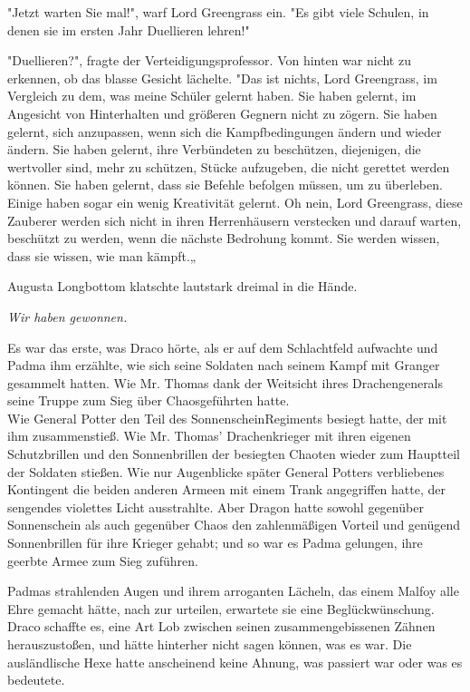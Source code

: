 {"Jetzt warten Sie mal!", warf Lord Greengrass ein. "Es gibt viele Schulen, in denen sie im ersten Jahr Duellieren lehren!"

"Duellieren?", fragte der Verteidigungsprofessor. Von hinten war nicht zu erkennen, ob das blasse Gesicht lächelte. "Das ist nichts, Lord Greengrass, im Vergleich zu dem, was meine Schüler gelernt haben. Sie haben gelernt, im Angesicht von Hinterhalten und größeren Gegnern nicht zu zögern. Sie haben gelernt, sich anzupassen, wenn sich die Kampfbedingungen ändern und wieder ändern. Sie haben gelernt, ihre Verbündeten zu beschützen, diejenigen, die wertvoller sind, mehr zu schützen, Stücke aufzugeben, die nicht gerettet werden können. Sie haben gelernt, dass sie Befehle befolgen müssen, um zu überleben. Einige haben sogar ein wenig Kreativität gelernt. Oh nein, Lord Greengrass, diese Zauberer werden sich nicht in ihren Herrenhäusern verstecken und darauf warten, beschützt zu werden, wenn die nächste Bedrohung kommt. Sie werden wissen, dass sie wissen, wie man kämpft.„

Augusta Longbottom klatschte lautstark dreimal in die Hände.

\emph{Wir haben gewonnen.}

Es war das erste, was Draco hörte, als er auf dem Schlachtfeld aufwachte und Padma ihm erzählte, wie sich seine Soldaten nach seinem Kampf mit Granger gesammelt hatten. Wie Mr. Thomas dank der Weitsicht ihres Drachengenerals seine Truppe zum Sieg über Chaosgeführten hatte.\\ Wie General Potter den Teil des SonnenscheinRegiments besiegt hatte, der mit ihm zusammenstieß. Wie Mr. Thomas' Drachenkrieger mit ihren eigenen Schutzbrillen und den Sonnenbrillen der besiegten Chaoten wieder zum Hauptteil der Soldaten stießen. Wie nur Augenblicke später General Potters verbliebenes Kontingent die beiden anderen Armeen mit einem Trank angegriffen hatte, der sengendes violettes Licht ausstrahlte. Aber Dragon hatte sowohl gegenüber Sonnenschein als auch gegenüber Chaos den zahlenmäßigen Vorteil und genügend Sonnenbrillen für ihre Krieger gehabt; und so war es Padma gelungen, ihre geerbte Armee zum Sieg zuführen.

Padmas strahlenden Augen und ihrem arroganten Lächeln, das einem Malfoy alle Ehre gemacht hätte, nach zur urteilen, erwartete sie eine Beglückwünschung. Draco schaffte es, eine Art Lob zwischen seinen zusammengebissenen Zähnen herauszustoßen, und hätte hinterher nicht sagen können, was es war. Die ausländlische Hexe hatte anscheinend keine Ahnung, was passiert war oder was es bedeutete.

}
